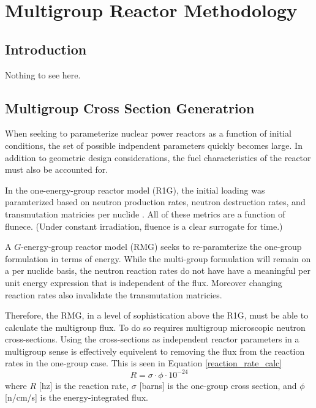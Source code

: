 \chapter{Multigroup Reactor Methodology}

\section{Introduction}
Nothing to see here.

\section{Multigroup Cross Section Generatrion}
When seeking to parameterize nuclear power reactors as a function of initial conditions, 
the set of possible indpendent parameters quickly becomes large. In addition to geometric 
design considerations, the fuel characteristics of the reactor must also be accounted for.

In the one-energy-group reactor model (R1G), the initial loading was paramterized based
on neutron production rates, neutron destruction rates, and transmutation matricies per
nuclide \cite{Scopatz2009d}.  All of these metrics are a function of flunece.  (Under 
constant irradiation, fluence is a clear surrogate for time.)

A $G$-energy-group reactor model (RMG) seeks to re-paramterize the one-group formulation 
in terms of energy.  While the multi-group formulation will remain on a per nuclide basis, 
the neutron reaction rates do not have have a meaningful per unit energy expression that 
is independent of the flux.  Moreover changing reaction rates also invalidate the 
transmutation matricies.  

Therefore, the RMG, in a level of sophistication above the R1G, must be able to calculate
the multigroup flux.  To do so requires multigroup microscopic neutron cross-sections.  
Using the cross-sections as independent reactor parameters in a multigroup sense is 
effectively equivelent to removing the flux from the reaction rates in the one-group case.
This is seen in Equation \ref{reaction_rate_calc}
\begin{equation}
\label{reaction_rate_calc}
R = \sigma \cdot \phi \cdot 10^{-24}
\end{equation}
where $R$ [hz] is the reaction rate, $\sigma$ [barns] is the one-group cross section, and
$\phi$ [n/cm/s] is the energy-integrated flux.


